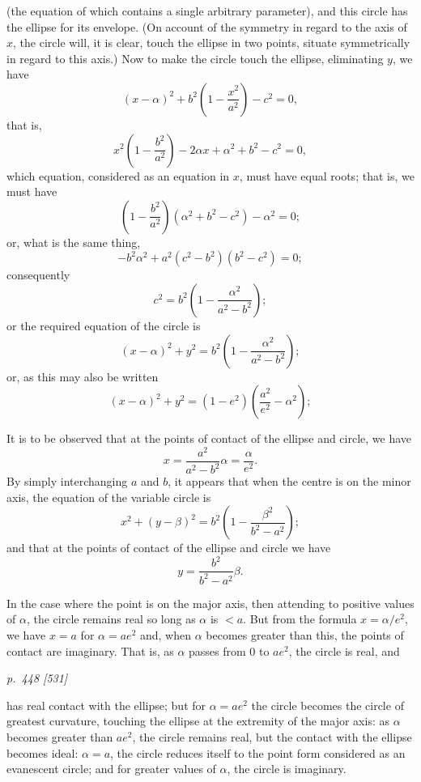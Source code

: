 \documentclass[11pt,a4paper]{book}
\begin{document}
(the equation of which contains a single arbitrary parameter), and this circle has the
ellipse for its envelope. (On account of the symmetry in regard to the axis of $x$, the
circle will, it is clear, touch the ellipse in two points, situate symmetrically in regard
to this axis.) Now to make the circle touch the ellipse, eliminating $y$, we have
\[
(x - \alpha)^2 + b^2\left(1 - \frac{x^2}{a^2}\right) - c^2 = 0,
\]
that is,
\[
x^2\left(1 - \frac{b^2}{a^2}\right) - 2\alpha x + \alpha^2 + b^2 - c^2 = 0,
\]
which equation, considered as an equation in $x$, must have equal roots; that is, we
must have
\[
\left(1 - \frac{b^2}{a^2}\right)(\alpha^2 + b^2 - c^2) - \alpha^2 = 0;
\]
or, what is the same thing,
\[
-b^2\alpha^2 + a^2(c^2 - b^2)(b^2 - c^2) = 0;
\]
consequently
\[
c^2 = b^2\left(1 - \frac{\alpha^2}{a^2 - b^2}\right);
\]
or the required equation of the circle is
\[
(x - \alpha)^2 + y^2 = b^2\left(1 - \frac{\alpha^2}{a^2 - b^2}\right);
\]
or, as this may also be written
\[
(x - \alpha)^2 + y^2 = (1 - e^2)\left(\frac{a^2}{e^2} - \alpha^2\right);
\]

It is to be observed that at the points of contact of the ellipse and circle, we have
\[
x = \frac{a^2}{a^2 - b^2}\alpha = \frac{\alpha}{e^2}.
\]
By simply interchanging $a$ and $b$, it appears that when the centre is on the minor axis,
the equation of the variable circle is
\[
x^2 + (y - \beta)^2 = b^2\left(1 - \frac{\beta^2}{b^2 - a^2}\right);
\]
and that at the points of contact of the ellipse and circle we have
\[
y = \frac{b^2}{b^2 - a^2}\beta.
\]

In the case where the point is on the major axis, then attending to positive
values of $\alpha$, the circle remains real so long as $\alpha$ is $< a$. But from the formula
$x = \alpha/e^2$, we have $x = a$ for $\alpha = ae^2$ and, when $\alpha$ becomes greater than this, the points
of contact are imaginary. That is, as $\alpha$ passes from $0$ to $ae^2$, the circle is real, and

\clearpage

\bigskip
\textit{p.~448 [531]}
\smallskip

has real contact with the ellipse; but for $\alpha = ae^2$ the circle becomes the circle of greatest
curvature, touching the ellipse at the extremity of the major axis: as $\alpha$ becomes
greater than $ae^2$, the circle remains real, but the contact with the ellipse becomes ideal:
$\alpha = a$, the circle reduces itself to the point form considered as an evanescent circle; and
for greater values of $\alpha$, the circle is imaginary.
\end{document}
